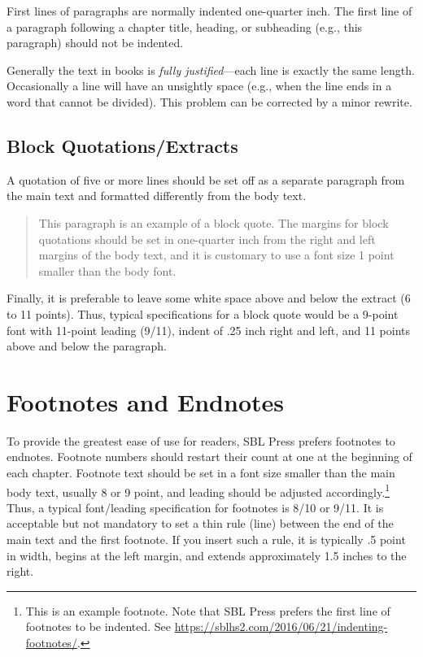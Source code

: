 \documentclass[sblidx={ancient sources, modern authors, subject}]{sblbook}
\begin{document}
First lines of paragraphs are normally indented one-quarter inch. The first
line of a paragraph following a chapter title, heading, or subheading (e.g.,
this paragraph) should not be indented.

Generally the text in books is \emph{fully justified}---each line is exactly
the same length. Occasionally a line will have an unsightly space (e.g., when
the line ends in a word that cannot be divided).  This problem can be
corrected by a minor rewrite.

\subsection{Block Quotations/Extracts}

A quotation of five or more lines should be set off as a separate paragraph from
the main text and formatted differently from the body text.
\begin{quote}
  This paragraph is an example of a block quote. The margins for block
  quotations should be set in one-quarter inch from the right and left margins
  of the body text, and it is customary to use a font size 1 point smaller
  than the body font.
\end{quote}
Finally, it is preferable to leave some white space above and below the
extract (6 to 11 points). Thus, typical specifications for a block quote would
be a 9-point font with 11-point leading (9/11), indent of .25 inch right and
left, and 11 points above and below the paragraph.

\section{Footnotes and Endnotes}

%
To provide the greatest ease of use for readers, SBL Press prefers footnotes
to endnotes. Footnote numbers should restart their count at
one at the beginning of each chapter. Footnote text should be set in a font
size smaller than the main body text, usually 8 or 9 point, and leading should
be adjusted accordingly.\footnote{This is an example
footnote. Note that SBL Press prefers the first line of
footnotes to be indented. See
\url{https://sblhs2.com/2016/06/21/indenting-footnotes/}.} Thus, a typical
font/leading specification for footnotes is 8/10 or 9/11. It is acceptable but
not mandatory to set a thin rule (line) between the end of the main text and
the first footnote. If you insert such a rule, it is typically .5 point in
width, begins at the left margin, and extends approximately 1.5 inches to the
right.
\end{document}
